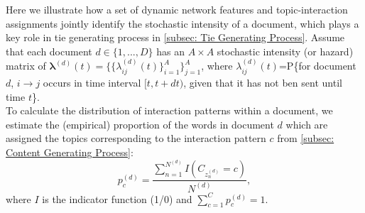 \documentclass[a4paper]{article}
\begin{document}

Here we illustrate how a set of dynamic network features and topic-interaction assignments  jointly identify the stochastic intensity of a document, which plays a key role in tie generating process in \ref{subsec: Tie Generating Process}. Assume that each document $d \in \{1,...,D\}$ has an $A\times A$ stochastic intensity (or hazard) matrix of $\boldsymbol{\lambda}^{(d)}(t) = \{\{\lambda^{(d)}_{ij}(t)\}_{i=1}^{A}\}_{j=1}^{A}$, where $\lambda^{(d)}_{ij}(t)$=P\{for document $d$, $i\rightarrow j$ occurs in time interval $[t, t+dt)$, given that it has not ben sent until time $t$\}. \\ \newline
To calculate the distribution of interaction patterns within a document, we estimate the (empirical) proportion of the words in document $d$ which are assigned the topics corresponding to the interaction pattern $c$ from \ref{subsec: Content Generating Process}: 
\begin{equation}
p_c^{(d)} = \frac{\sum_{n=1}^{N^{(d)}}I(C_{z_n^{(d)}}=c)}{N^{(d)}},
\end{equation}
where $I$ is the indicator function (1/0) and $\sum\limits_{c=1}^{C}p_c^{(d)}=1$.\\\\ \newline
\end{document}
